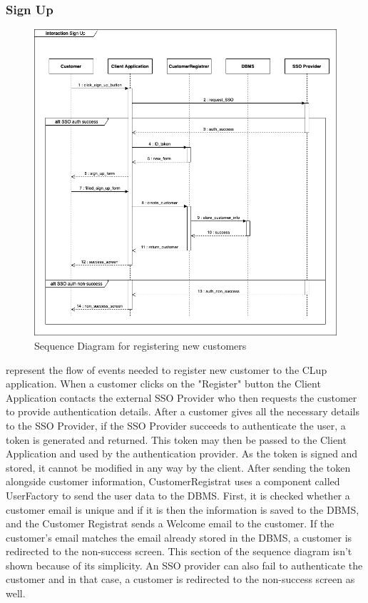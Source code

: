 \subsubsection{Sign Up}
\begin{figure}[H]
    \centering
    \includegraphics[height=0.4\textwidth]{Images/SequenceDiagrams/SignUp.png}
    \caption{Sequence Diagram for registering new customers}
    \label{fig:SDSignUp}
\end{figure}
 represent the flow of events needed to register new customer to the CLup application.
When a customer clicks on the "Register" button the Client Application contacts the external SSO Provider who then requests the customer to provide authentication details.
After a customer gives all the necessary details to the SSO Provider, if the SSO Provider succeeds to authenticate the user, a token is generated and returned.
This token may then be passed to the Client Application and used by the authentication provider.
As the token is signed and stored, it cannot be modified in any way by the client. After sending the token alongside customer information, CustomerRegistrat uses a component called UserFactory to send the user data to the DBMS.
First, it is checked whether a customer email is unique and if it is then the information is saved to the DBMS, and the Customer Registrat sends a Welcome email to the customer.
If the customer's email matches the email already stored in the DBMS, a customer is redirected to the non-success screen. This section of the sequence diagram isn't shown because of its simplicity.
An SSO provider can also fail to authenticate the customer and in that case, a customer is redirected to the non-success screen as well.

